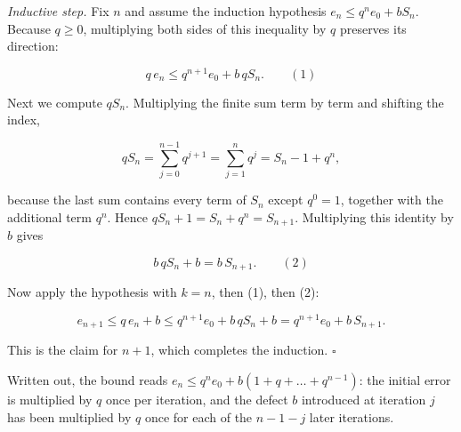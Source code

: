 \documentclass[11pt,a4paper]{article}
\begin{document}
\emph{Inductive step.} Fix \(n\) and assume the induction hypothesis \(e_n\le q^ne_0+bS_n\). Because \(q\ge0\), multiplying both sides of this inequality by \(q\) preserves its direction:


\[q\,e_n\le q^{n+1}e_0+b\,qS_n.\qquad(1)\]


Next we compute \(qS_n\). Multiplying the finite sum term by term and shifting the index,


\[qS_n=\sum_{j=0}^{n-1}q^{j+1}=\sum_{j=1}^{n}q^{j}=S_n-1+q^n,\]


because the last sum contains every term of \(S_n\) except \(q^0=1\), together with the additional term \(q^n\). Hence \(qS_n+1=S_n+q^n=S_{n+1}\). Multiplying this identity by \(b\) gives


\[b\,qS_n+b=b\,S_{n+1}.\qquad(2)\]


Now apply the hypothesis with \(k=n\), then (1), then (2):


\[e_{n+1}\le q\,e_n+b\le q^{n+1}e_0+b\,qS_n+b=q^{n+1}e_0+b\,S_{n+1}.\]


This is the claim for \(n+1\), which completes the induction. \(\square\)




Written out, the bound reads \(e_n\le q^ne_0+b(1+q+\dots+q^{n-1})\): the initial error is multiplied by \(q\) once per iteration, and the defect \(b\) introduced at iteration \(j\) has been multiplied by \(q\) once for each of the \(n-1-j\) later iterations.
\end{document}
